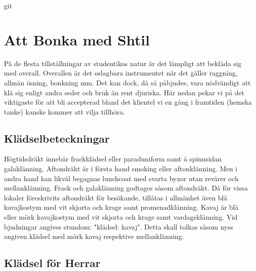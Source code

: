 git 
\pagestyle{Att Bonka med Shtil}

\section*{\textbf{Att Bonka med Shtil}}

På de flesta tillställningar av studentikos natur är det lämpligt att bekläda sig med overall. Overallen är det oslagbara instrumentet när det gäller raggning, allmän ösning, bonkning  mm. Det kan dock, då så påbjudes, vara nödvändigt att klä sig enligt andra seder och bruk än rent djuriska. Här nedan pekar vi på det viktigaste för att bli accepterad bland det klientel vi en gång i framtiden (hemska tanke) kanske kommer att vilja tillhöra.

\subsection*{\textbf{Klädselbeteckningar}}
Högtidsdräkt innebär frackklädsel eller paraduniform samt å spinnsidan galaklänning. Aftondräkt är i första hand smoking eller aftonklänning. Men i andra hand kan likväl begagnas lunchcoat med svarta byxor utan revärer och mellanklänning. Frack och galaklänning godtages såsom aftondräkt. Då för vissa lokaler föreskrivits aftondräkt för besökande, tillåtas i allmänhet även blå kavajkostym med vit skjorta och krage samt promenadklänning. Kavaj är blå eller mörk kavajkostym med vit skjorta och krage samt vardagsklänning. Vid bjudningar angives stundom: "klädsel: kavaj". Detta skall tolkas såsom nyss angiven klädsel med mörk kavaj respektive mellanklänning.

\subsection*{\textbf{Klädsel för Herrar}}
